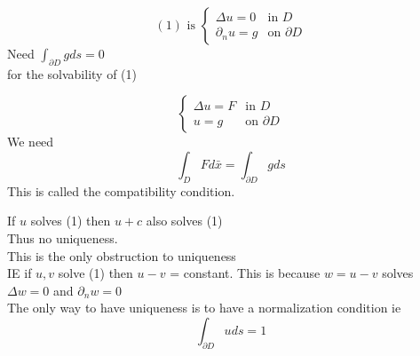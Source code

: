 \documentclass[answers,12pt,addpoints]{exam}
\begin{document}
\begin{example}
    $$(1) \text{ is } \begin{cases}
        \Delta u = 0 & \text{in } D\\
        \partial_n u = g & \text{on } \partial D
    \end{cases}$$
    Need $\int_{\partial D} g ds = 0$\\
    for the solvability of (1)\\ 
\end{example}
\begin{remark}
    $$\begin{cases}
        \Delta u = F & \text{in } D\\
        u = g & \text{on } \partial D
    \end{cases}$$
    We need 
    $$\int_{D} F d\bar{x} = \int_{\partial D} g ds$$
    This is called the compatibility condition.
\end{remark}
\begin{remark}
    If $u$ solves (1) then $u + c$ also solves (1)\\
    Thus no uniqueness.\\
    This is the only obstruction to uniqueness\\
    IE if $u,v$ solve (1) then $u-v$ = constant.
    This is because $w = u-v$ solves $\Delta w = 0$ and $\partial_n w = 0$\\
    The only way to have uniqueness is to have a normalization condition ie 
    $$\int_{\partial D} u ds = 1$$  
\end{remark}
\end{document}
